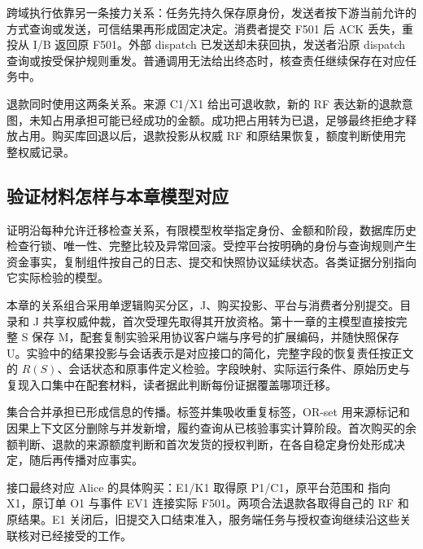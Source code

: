 跨域执行依靠另一条接力关系：任务先持久保存原身份，发送者按下游当前允许的方式查询或发送，可信结果再形成固定决定。消费者提交 F501 后 ACK 丢失，重投从 I/B 返回原 F501。外部 dispatch 已发送却未获回执，发送者沿原 dispatch 查询或按受保护规则重发。普通调用无法给出终态时，核查责任继续保存在对应任务中。

退款同时使用这两条关系。来源 C1/X1 给出可退收款，新的 RF 表达新的退款意图，未知占用承担可能已经成功的金额。成功把占用转为已退，足够最终拒绝才释放占用。购买库回退以后，退款投影从权威 RF 和原结果恢复，额度判断使用完整权威记录。

\subsection*{验证材料怎样与本章模型对应}

证明沿每种允许迁移检查关系，有限模型枚举指定身份、金额和阶段，数据库历史检查行锁、唯一性、完整比较及异常回滚。受控平台按明确的身份与查询规则产生资金事实，复制组件按自己的日志、提交和快照协议延续状态。各类证据分别指向它实际检验的模型。

本章的关系组合采用单逻辑购买分区，J、购买投影、平台与消费者分别提交。目录和 J 共享权威仲裁，首次受理先取得其开放资格。第十一章的主模型直接按完整 S 保存 M，配套复制实验采用协议客户端与序号的扩展编码，并随快照保存 U。实验中的结果投影与会话表示是对应接口的简化，完整字段的恢复责任按正文的 $R(S)$、会话状态和原事件定义检验。字段映射、实际运行条件、原始历史与复现入口集中在配套材料，读者据此判断每份证据覆盖哪项迁移。

集合合并承担已形成信息的传播。标签并集吸收重复标签，OR-set 用来源标记和因果上下文区分删除与并发新增，履约查询从已核验事实计算阶段。首次购买的余额判断、退款的来源额度判断和首次发货的授权判断，在各自稳定身份处形成决定，随后再传播对应事实。

接口最终对应 Alice 的具体购买：E1/K1 取得原 P1/C1，原平台范围和  指向 X1，原订单 O1 与事件 EV1 连接实际 F501。两项合法退款各取得自己的 RF 和原结果。E1 关闭后，旧提交入口结束准入，服务端任务与授权查询继续沿这些关联核对已经接受的工作。
\FloatBarrier
